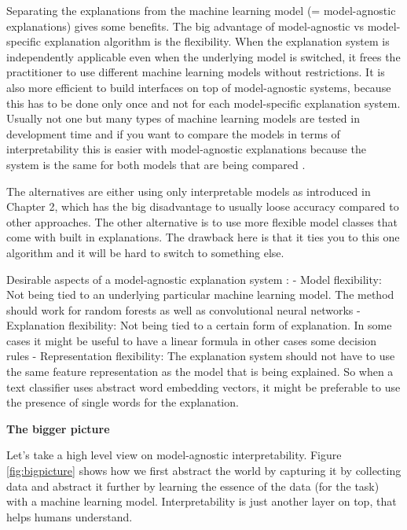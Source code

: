\documentclass[12pt,]{krantz}
\theoremstyle{definition}
\theoremstyle{definition}
\theoremstyle{definition}
\theoremstyle{remark}
\begin{document}
Separating the explanations from the machine learning model (=
model-agnostic explanations) gives some benefits. The big advantage of
model-agnostic vs model-specific explanation algorithm is the
flexibility. When the explanation system is independently applicable
even when the underlying model is switched, it frees the practitioner to
use different machine learning models without restrictions. It is also
more efficient to build interfaces on top of model-agnostic systems,
because this has to be done only once and not for each model-specific
explanation system. Usually not one but many types of machine learning
models are tested in development time and if you want to compare the
models in terms of interpretability this is easier with model-agnostic
explanations because the system is the same for both models that are
being compared \citep{Ribeiro2016b}.

The alternatives are either using only interpretable models as
introduced in Chapter 2, which has the big disadvantage to usually loose
accuracy compared to other approaches. The other alternative is to use
more flexible model classes that come with built in explanations. The
drawback here is that it ties you to this one algorithm and it will be
hard to switch to something else.

Desirable aspects of a model-agnostic explanation system
\citep{Ribeiro2016b}: - Model flexibility: Not being tied to an
underlying particular machine learning model. The method should work for
random forests as well as convolutional neural networks - Explanation
flexibility: Not being tied to a certain form of explanation. In some
cases it might be useful to have a linear formula in other cases some
decision rules - Representation flexibility: The explanation system
should not have to use the same feature representation as the model that
is being explained. So when a text classifier uses abstract word
embedding vectors, it might be preferable to use the presence of single
words for the explanation.

\textbf{The bigger picture}

Let's take a high level view on model-agnostic interpretability. Figure
\ref{fig:bigpicture} shows how we first abstract the world by capturing
it by collecting data and abstract it further by learning the essence of
the data (for the task) with a machine learning model. Interpretability
is just another layer on top, that helps humans understand.
\end{document}
